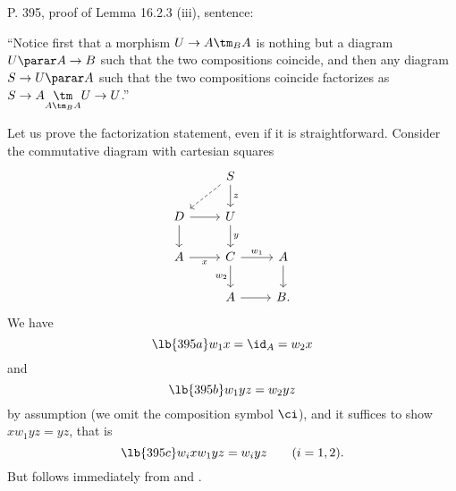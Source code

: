 \documentclass[12pt]{article}
\theoremstyle{remark}
\theoremstyle{definition}
\begin{document}
%

\begin{s}
P. 395, proof of Lemma 16.2.3 (iii), sentence:

\nn``Notice first that a morphism $U\to A\tm_BA$ is nothing but a diagram $U\parar A \to B$ such that the two compositions coincide, and then any diagram $S\to U\parar A$ such that the two compositions coincide factorizes as $S\to A\underset{A\tm_BA}{\tm}U\to U$.''

Let us prove the factorization statement, even if it is straightforward. Consider the commutative diagram with cartesian squares
$$
\begin{tikzcd}
&S\ar[dl,dashed]\ar[d,"z"]\\ 
D\ar[d]\ar[r]&U\ar[d,"y"]\\
A\ar[r,"x"']&C\ar[d,"w_2"']\ar[r,"w_1"]&A\ar[d]\\ 
&A\ar[r]&B.
\end{tikzcd}
$$ 
We have 
\begin{equation}\lb{395a}
w_1x=\id_A=w_2x
\end{equation}
and
\begin{equation}\lb{395b}
w_1yz=w_2yz
\end{equation}
by assumption (we omit the composition symbol $\ci$), and it suffices to show $xw_1yz=yz$, that is 
\begin{equation}\lb{395c}
w_ixw_1yz=w_iyz\qquad(i=1,2).
\end{equation}
But  follows immediately from  and .
\end{s}

%
\end{document}
